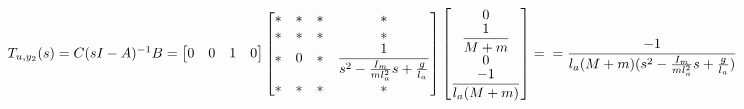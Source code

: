 $T_{u,y_2}(s)=C(sI-A)^{-1}B=
\begin{bmatrix}
0&0&1&0
\end{bmatrix}
\begin{bmatrix}
*&*&*&*\\
*&*&*&*\\
*&0&*&\displaystyle\frac{1}{s^2-\frac{I_m}{ml_a^2}s+\frac{g}{l_a}}\\
*&*&*&*
\end{bmatrix}
\begin{bmatrix}
0\\
\displaystyle\frac{1}{M+m}\\
0\\
\displaystyle\frac{-1}{l_a(M+m)}\\
\end{bmatrix} = \\
=\displaystyle\frac{-1}{l_a(M+m)(s^2-\frac{I_m}{ml_a^2}s+\frac{g}{l_a})}
$



